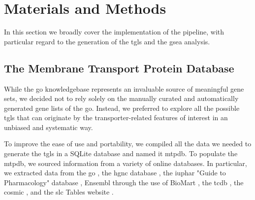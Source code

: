 \section{Materials and Methods}

In this section we broadly cover the implementation of the pipeline, with
particular regard to the generation of the \glspl{tgl} and the \gls{gsea}
analysis.

\subsection{The Membrane Transport Protein Database}
While the \gls{go} knowledgebase \cite{ashburnerGeneOntologyTool2000,
thegeneontologyconsortiumGeneOntologyKnowledgebase2023} represents an invaluable
source of meaningful gene sets, we decided not to rely solely on the manually curated and
automatically generated gene lists of the \gls{go}. Instead, we preferred to
explore all the possible \glspl{tgl} that can originate by the
transporter-related features of interest in an unbiased and systematic way.

To improve the ease of use and portability, we compiled all the data we needed
to generate the \glspl{tgl} in a SQLite database and named it \gls{mtpdb}. To
populate the \gls{mtpdb}, we sourced information from a variety of online
databases. In particular, we extracted data from the \gls{go}
\cite{ashburnerGeneOntologyTool2000,
thegeneontologyconsortiumGeneOntologyKnowledgebase2023}, the \gls{hgnc} database
\cite{sealGenenamesOrgHGNC2023}, the \gls{iuphar} "Guide to Pharmacology"
database \cite{hardingIUPHARBPSGuide2022}, Ensembl
\cite{cunninghamEnsembl20222022} through the use of BioMart
\cite{smedleyBioMartBiologicalQueries2009}, the \gls{tcdb}
\cite{saierTransporterClassificationDatabase2021}, the \gls{cosmic}
\cite{tateCOSMICCatalogueSomatic2019}, and the \gls{slc} Tables website
\cite{hedigerABCsMembraneTransporters2013}.

